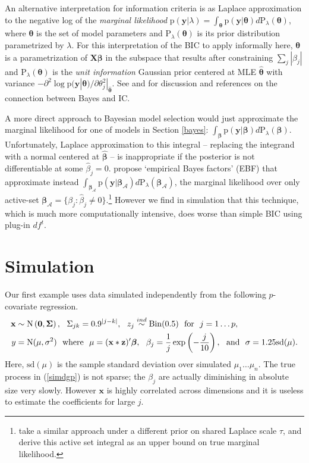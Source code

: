 \documentclass[12pt]{article}
\newcommand{\bs}[1]{\boldsymbol{#1}}
\newcommand{\mc}[1]{\mathcal{#1}}
\newcommand{\mr}[1]{\mathrm{#1}}
\newcommand{\bm}[1]{\mathbf{#1}}
\begin{document}
An alternative  interpretation for information criteria is as Laplace
approximation \citep{de_bruijn_asymptotic_1958} to the negative log of the
{\it marginal likelihood} $\mr{p}(\bm{y} | \lambda) = \int_{\bs{\theta}}
\mr{p}( \bm{y} | \bs{\theta} ) d\mr{P}_\lambda(\bs{\theta})$, where
$\bs{\theta}$ is the set of model parameters and
$\mr{P}_\lambda(\bs{\theta})$ is its prior distribution parametrized by
 $\lambda$. For this interpretation of the BIC to apply
informally here, $\bs{\theta}$ is a 
parametrization of $\bm{X}\bs{\beta}$ in the subspace that results after constraining $\sum_j |\beta_j|$  and $\mr{P}_\lambda(\bs{\theta})$ is the
{\it unit information} Gaussian prior centered at  MLE $\bs{\hat\theta}$ with
variance $-\partial^2\log\mr{p}(\bm{y}| \bs{\theta} )/\partial\theta_j^2
|_{\bs{\hat\theta}}$. See \citet{kass_bayes_1995} and
\citet{spiegelhalter_bayesian_2002} for discussion and references on the
connection between Bayes and IC.



A more direct approach to Bayesian model selection would just approximate the
marginal likelihood for one of models in Section \ref{bayes}:
$\int_{\bs{\beta}} \mr{p}( \bm{y} | \bs{\beta} ) d\mr{P}_\lambda(\bs{\beta})$.
Unfortunately, Laplace approximation to this integral -- replacing the
integrand with a normal centered at  $\bs{\hat\beta}$ --  is inappropriate if
the posterior is not differentiable at some $\hat\beta_j=0$.
\citet{zhou_path_2012} propose  `empirical Bayes factors' (EBF) that
approximate instead $\int_{\bs{\beta}_\mc{A}} \mr{p}( \bm{y} |
\bs{\beta}_\mc{A} ) d\mr{P}_\lambda(\bs{\beta}_\mc{A})$, the marginal
likelihood over only active-set $\bs{\beta}_\mc{A} = \{\beta_j: \hat\beta_j
\neq 0\}$.\footnote{\citet{yuan_efficient_2005} take a similar approach under
a different prior on shared Laplace scale $\tau$, and derive this active set
integral as an upper bound on true marginal likelihood.} However we find in
simulation that this technique, which is much more computationally intensive,
does worse than simple BIC using plug-in $df^t$.

\section{Simulation}
\label{sim}

Our first example uses data simulated independently from the following
$p$-covariate regression.
\begin{align}
\label{simdgp}
\bm{x} &\sim \mr{N}\left(\bm{0},\bs{\Sigma}\right),~~\Sigma_{jk} = 0.9^{|j-k|},~~z_{j} \stackrel{ind}{\sim} \mr{Bin}(0.5)~~\text{for}~~j=1\ldots p,
 \\
y &= \mr{N}(\mu,\sigma^2)~~\text{where}~~\mu = (\bm{x}*\bm{z})'\bs{\beta},~~\beta_j = \frac{1}{j}\exp\left(-\frac{j}{10}\right),~~\text{and}
~~\sigma=1.25\mr{sd}(\mu).\notag
\end{align}
Here, $\mr{sd}(\mu)$ is the sample standard deviation over simulated $\mu_1\ldots\mu_n$.  The true process in (\ref{simdgp}) is not sparse; the $\beta_j$ are actually diminishing in absolute size very slowly.  However $\bm{x}$ is highly
correlated across dimensions and it is useless to estimate the coefficients
for large $j$.  
\end{document}
